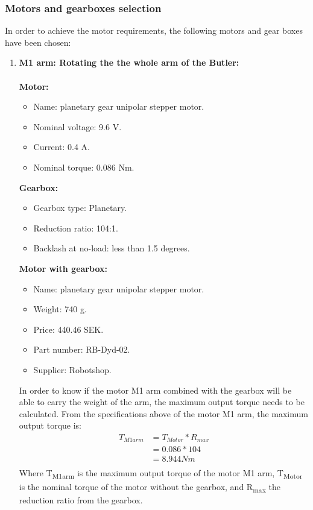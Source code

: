 \subsubsection{Motors and gearboxes selection}
In order to achieve the motor requirements, the following motors and gear boxes have been chosen:
\\
\begin{enumerate}
    \item \textbf{M1 arm: Rotating the the whole arm of the Butler:}\\\\
    \textbf{Motor:}
    \begin{itemize}
        \item Name: planetary gear unipolar stepper motor\cite{m1}.
        \item Nominal voltage: 9.6 V.
        \item Current: 0.4 A.
        \item Nominal torque: 0.086 Nm.\\
    \end{itemize}
    
    \textbf{Gearbox:}
    \begin{itemize}
        \item Gearbox type: Planetary.
        \item Reduction ratio: 104:1.
        \item Backlash at no-load: less than 1.5 degrees.\\
    \end{itemize}
    
    \textbf{Motor with gearbox:}
    \begin{itemize}
        \item Name: planetary gear unipolar stepper motor.
        \item Weight: 740 g.
        \item Price: 440.46 SEK.
        \item Part number: RB-Dyd-02.
        \item Supplier: Robotshop.
     \end{itemize}
    In order to know if the motor M1 arm combined with the gearbox will be able to carry the weight of the arm, the maximum output torque needs to be calculated. 
    From the specifications above of the motor M1 arm, the maximum output torque is:\\
    \begin{equation} \label{eq: T_M1arm}
    \begin{split}
    T_{M1arm} & = T_{Motor} * R_{max}\\
    & =  0.086 * 104\\
    & = 8.944 Nm\\
    \end{split}
    \end{equation}
    Where T\textsubscript{M1arm} is the maximum output torque of the motor M1 arm, T\textsubscript{Motor} is the nominal torque of the motor without the gearbox, and R\textsubscript{max} the reduction ratio from the gearbox.
    

\end{enumerate}
